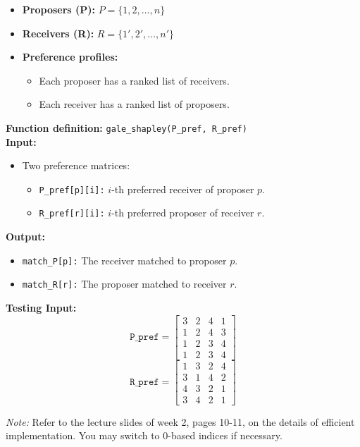 \documentclass[12pt]{article}
\begin{document}
\begin{itemize}
    \item \textbf{Proposers (P):} $P= \{1, 2, \ldots, n\}$
    \item \textbf{Receivers (R):} $R= \{1', 2', \ldots, n'\}$
    \item \textbf{Preference profiles:}
    \begin{itemize}
        \item Each proposer has a ranked list of receivers.
        \item Each receiver has a ranked list of proposers.
    \end{itemize}
\end{itemize}


\textbf{Function definition:} \texttt{gale\_shapley(P\_pref, R\_pref)} \\

\textbf{Input:}
\begin{itemize}
    \item Two preference matrices:
    \begin{itemize}
        \item \texttt{P\_pref[p][i]:} $i$-th preferred receiver of proposer $p$.
        \item \texttt{R\_pref[r][i]:} $i$-th preferred proposer of receiver $r$.
    \end{itemize}
\end{itemize}

\textbf{Output:}
\begin{itemize}
    \item \texttt{match\_P[p]:} The receiver matched to proposer $p$.
    \item \texttt{match\_R[r]:} The proposer matched to receiver $r$.
\end{itemize}

\textbf{Testing Input:}
\[
\texttt{P\_pref} = 
\begin{bmatrix}
3 & 2 & 4 & 1 \\
1 & 2 & 4 & 3 \\
1 & 2 & 3 & 4 \\
1 & 2 & 3 & 4
\end{bmatrix}
\]
\[
\texttt{R\_pref} = 
\begin{bmatrix}
1 & 3 & 2 & 4 \\
3 & 1 & 4 & 2 \\
4 & 3 & 2 & 1 \\
3 & 4 & 2 & 1
\end{bmatrix}
\]

\textit{Note:} Refer to the lecture slides of week 2, pages 10-11, on the details of efficient implementation. You may switch to 0-based indices if necessary.
\end{document}
